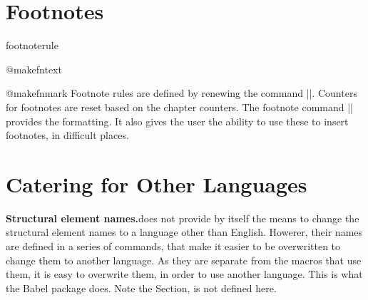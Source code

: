 \section{Footnotes}
\label{book:footnotes}

\begin{docCommand}{footnoterule}{}
\begin{docCommand}{@makefntext}{}
\begin{docCommand}{@makefnmark}{}
 Footnote rules are defined by renewing the command |\footnoterule|. Counters for footnotes are reset based on the chapter counters. The footnote command |\@makefntext| provides the formatting. It also gives the user the ability to use these to insert footnotes, in difficult places.
\end{docCommand}
\end{docCommand}
\end{docCommand}

\begin{teX}
\renewcommand\footnoterule{%
  \kern-3\p@
  \hrule\@width.4\columnwidth 
  \kern2.6\p@}


\newcommand\@makefntext[1]{%
    \parindent 1em%
    \noindent
    \hb@xt@1.8em{\hss\@makefnmark}#1}
\end{teX}

\section*{Catering for Other Languages}

\begin{multicols}{2}
\textbf{Structural element names.}\quad \latex does not provide by itself the means to change the structural element names to a language other than English. Howerer, their names are defined  in a series of commands, that make it easier to be overwritten to change them to another language. As they are separate from the macros that use them, it is easy to overwrite them, in order to use another language. This is what the Babel package does. Note the Section, is not defined here.
\end{multicols}

\begin{teX}
\newcommand\contentsname{Contents}
\newcommand\listfigurename{List of Figures}
\newcommand\listtablename{List of Tables}
\newcommand\bibname{Bibliography}
\newcommand\indexname{Index}
\newcommand\figurename{Figure}
\newcommand\tablename{Table}
\newcommand\partname{Part}
\newcommand\chaptername{Chapter}
\newcommand\appendixname{Appendix}
\end{teX}

